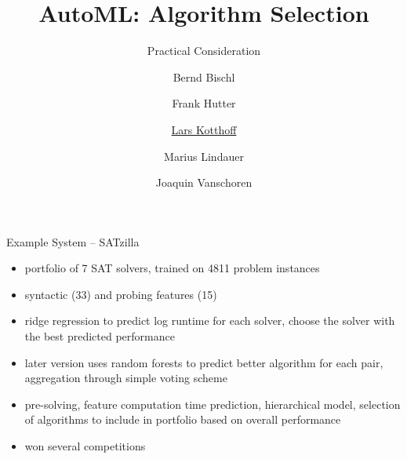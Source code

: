 


\title[AutoML: Overview]{AutoML: Algorithm Selection} %
\subtitle{Practical Consideration} %
\author[Marius Lindauer]{Bernd Bischl \and Frank Hutter \and \underline{Lars Kotthoff}\newline \and Marius Lindauer \and Joaquin Vanschoren}
\institute{}
\date{}




	
	\maketitle
	

\begin{frame}{Example System -- SATzilla}
\begin{itemize}
\item portfolio of 7 SAT solvers, trained on 4811 problem instances
\item syntactic (33) and probing features (15)
\item ridge regression to predict log runtime for each solver, choose the solver with the best predicted performance
\item later version uses random forests to predict better algorithm for each
 pair, aggregation through simple voting scheme
\item pre-solving, feature computation time prediction, hierarchical model,
selection of algorithms to include in portfolio based on overall performance
\item won several competitions
\end{itemize}
\end{frame}

